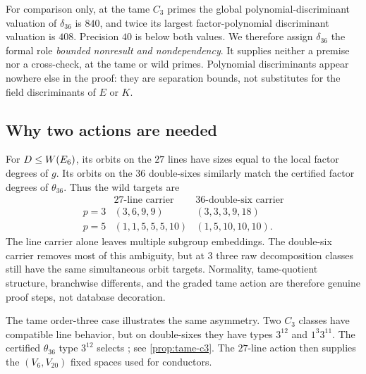 For comparison only, at the tame $C_3$ primes the global
polynomial-discriminant valuation of $\delta_{36}$ is $840$, and twice its
largest factor-polynomial discriminant valuation is $408$.  Precision $40$
is below both values.  We therefore assign $\delta_{36}$ the formal role
\emph{bounded nonresult and nondependency}.  It supplies neither a premise
nor a cross-check, at the tame or wild primes.  Polynomial discriminants
appear nowhere else in the proof: they are separation bounds, not
substitutes for the field discriminants of $E$ or $K$.

\subsection{Why two actions are needed}

For $D\leq W(E_6)$, its orbits on the $27$ lines have sizes equal to the local
factor degrees of $g$.  Its orbits on the $36$ double-sixes similarly match
the certified factor degrees of $\theta_{36}$.  Thus the wild targets are
\begin{equation}
\begin{array}{c|cc}
&27\text{-line carrier}&36\text{-double-six carrier}\\ \hline
p=3&(3,6,9,9)&(3,3,3,9,18)\\
p=5&(1,1,5,5,5,10)&(1,5,10,10,10).
\end{array}
\label{eq:wild-carrier-targets}
\end{equation}
The line carrier alone leaves multiple subgroup embeddings.  The double-six
carrier removes most of this ambiguity, but at $3$ three raw decomposition
classes still have the same simultaneous orbit targets.  Normality,
tame-quotient structure, branchwise differents, and the graded tame action
are therefore genuine proof steps, not database decoration.

The tame order-three case illustrates the same asymmetry.  Two $C_3$ classes
have compatible line behavior, but on double-sixes they have types
$3^{12}$ and $1^3 3^{11}$.  The certified $\theta_{36}$ type $3^{12}$
selects ; see \cref{prop:tame-c3}.  The $27$-line action then supplies
the $(V_6,V_{20})$ fixed spaces used for conductors.
